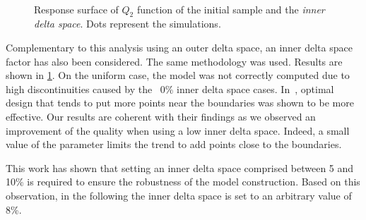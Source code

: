 \begin{figure}[h]               
\centering
{}
 ~       
\caption{Response surface of $Q_2$ function of the initial sample and the \textit{inner delta space}. Dots represent the simulations.}
\label{fig:inner-delta}
\end{figure}

Complementary to this analysis using an outer delta space, an inner delta space factor has also been considered. The same methodology was used. Results are shown in \cref{fig:inner-delta}. On the uniform case, the model was not correctly computed due to high discontinuities caused by the ~0\% inner delta space cases. In~\cite{dette2010}, optimal design that tends to put more points near the boundaries was shown to be more effective. Our results are coherent with their findings as we observed an improvement of the quality when using a low inner delta space. Indeed, a small value of the parameter limits the trend to add points close to the boundaries.

This work has shown that setting an inner delta space comprised between 5 and 10\% is required to ensure the robustness of the model construction. Based on this observation, in the following the inner delta space is set to an arbitrary value of 8\%.

